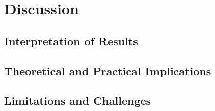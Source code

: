 \chapter{Discussion}

\section{Interpretation of Results}

\section{Theoretical and Practical Implications}

\section{Limitations and Challenges}